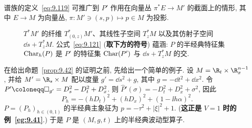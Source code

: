 谱族的定义~\eqref{eq:9.119} 可推广到 $P'$ 作用在向量丛 $\pi^* E \to M'$ 的截面上的情形, 其中 $E \to M$ 为向量丛, $\pi \colon M' \ni (s, p) \mapsto p \in M$ 为投影.

\begin{figure}[htbp]
\centering
\drawFigNineSix
\caption{$T^* M'$ 的纤维 $T_{(0,z)}^* M'$、其线性子空间 $T_z^* M$ 以及其仿射子空间 $\dd s + T_z^* M$. 公式~\eqref{eq:9.121} (\textbf{取下方的符号}) 蕴涵: $P$ 的半经典特征集 $\operatorname{Char}_h(P)$ 是 $P'$ 的特征集 $\operatorname{Char}(P')$ 与 $\dd s + T_z^* M$ 的交.}\label{fig:9.6}
\end{figure}

在给出命题~\ref{prop:9.42} 的证明之前, 先给出一个简单的例子. 设 $M = \R_t \times \R_x^{n-1}$, 并给 $M' = \R_s \times M$ 配以度量 $g' = \dd s^2 + g$, 其中 $g = -\dd t^2 + \dd x^2$. 令 $P' \defeq \Box_{g'} = D_s^2 - D_t^2 + D_x^2$. 则 $\widehat{P}'(\sigma) = -D_t^2 + D_x^2 + \sigma^2$, 因此
\begin{equation}\label{eq:9.122}
    P_h = -(h D_t)^2 + (h D_x)^2 + (1 - \ii h \alpha)^2.
\end{equation}
$P = (P_h)_{h \in (0,1)}$ 的半经典主象征为 $p = -\tau^2 + |\xi|^2 + 1$. (\textbf{这正是} $V = 1$ \textbf{时的例~\ref{eg:9.41}}.) 于是 $P$ 是 $(M, g, t)$ 上的半经典波动型算子.

